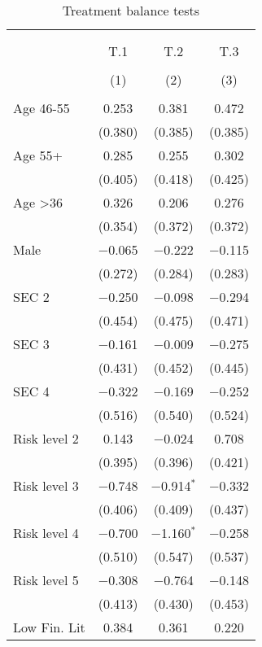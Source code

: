 
\begin{table}[!htbp] \centering 
  \caption{Treatment balance tests} 
  \label{tbl:balance} 
\begin{tabular}{@{\extracolsep{5pt}}lccc} 
\\[-1.8ex]\hline 
\hline \\[-1.8ex] 
\\[-1.8ex] & T.1 & T.2 & T.3 \\ 
\\[-1.8ex] & (1) & (2) & (3)\\ 
\hline \\[-1.8ex] 
 Age 46-55 & 0.253 & 0.381 & 0.472 \\ 
  & (0.380) & (0.385) & (0.385) \\ 
  Age 55+ & 0.285 & 0.255 & 0.302 \\ 
  & (0.405) & (0.418) & (0.425) \\ 
  Age >36 & 0.326 & 0.206 & 0.276 \\ 
  & (0.354) & (0.372) & (0.372) \\ 
  Male & $-$0.065 & $-$0.222 & $-$0.115 \\ 
  & (0.272) & (0.284) & (0.283) \\ 
  SEC 2 & $-$0.250 & $-$0.098 & $-$0.294 \\ 
  & (0.454) & (0.475) & (0.471) \\ 
  SEC 3 & $-$0.161 & $-$0.009 & $-$0.275 \\ 
  & (0.431) & (0.452) & (0.445) \\ 
  SEC 4 & $-$0.322 & $-$0.169 & $-$0.252 \\ 
  & (0.516) & (0.540) & (0.524) \\ 
  Risk level 2 & 0.143 & $-$0.024 & 0.708 \\ 
  & (0.395) & (0.396) & (0.421) \\ 
  Risk level 3 & $-$0.748 & $-$0.914$^{*}$ & $-$0.332 \\ 
  & (0.406) & (0.409) & (0.437) \\ 
  Risk level 4 & $-$0.700 & $-$1.160$^{*}$ & $-$0.258 \\ 
  & (0.510) & (0.547) & (0.537) \\ 
  Risk level 5 & $-$0.308 & $-$0.764 & $-$0.148 \\ 
  & (0.413) & (0.430) & (0.453) \\ 
  Low Fin. Lit & 0.384 & 0.361 & 0.220 \\ 

\end{tabular}
\end{table}
